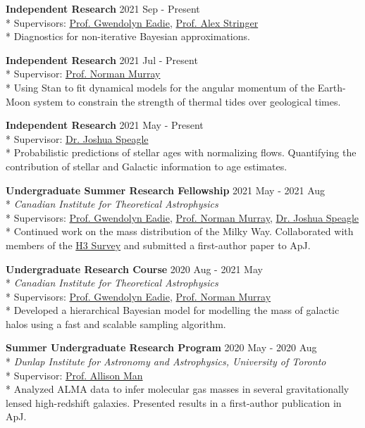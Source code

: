 \documentclass[11pt]{extarticle}
\begin{document}
\textbf{Independent Research} \hfill 2021 Sep - Present \\*
Supervisors: \href{https://www.astro.utoronto.ca/~eadie/cover.html}{Prof. Gwendolyn Eadie}, \href{https://www.alexstringer.ca/}{Prof. Alex Stringer} \\*
Diagnostics for non-iterative Bayesian approximations. 

\textbf{Independent Research} \hfill 2021 Jul - Present \\*
Supervisor: \href{https://www.cita.utoronto.ca/~murray/}{Prof. Norman Murray} \\*
Using Stan to fit dynamical models for the angular momentum of the Earth-Moon system to constrain the strength of thermal tides over geological times. 

\textbf{Independent Research} \hfill 2021 May - Present \\*
Supervisor: \href{https://joshspeagle.github.io/}{Dr. Joshua Speagle} \\*
Probabilistic predictions of stellar ages with normalizing flows. Quantifying the contribution of stellar and Galactic information to age estimates. 

\textbf{Undergraduate Summer Research Fellowship} \hfill 2021 May - 2021 Aug \\*
\textit{Canadian Institute for Theoretical Astrophysics} \\*
Supervisors: \href{https://www.astro.utoronto.ca/~eadie/cover.html}{Prof. Gwendolyn Eadie}, \href{https://www.cita.utoronto.ca/~murray/}{Prof. Norman Murray}, \href{https://joshspeagle.github.io/}{Dr. Joshua Speagle} \\*
Continued work on the mass distribution of the Milky Way. Collaborated with members of the \href{http://h3survey.rc.fas.harvard.edu/}{H3 Survey} and submitted a first-author paper to ApJ.

\textbf{Undergraduate Research Course} \hfill 2020 Aug - 2021 May\\*
\textit{Canadian Institute for Theoretical Astrophysics} \\*
Supervisors: \href{https://www.astro.utoronto.ca/~eadie/cover.html}{Prof. Gwendolyn Eadie}, \href{https://www.cita.utoronto.ca/~murray/}{Prof. Norman Murray} \\*
Developed a hierarchical Bayesian model for modelling the mass of galactic halos using a fast and scalable sampling algorithm. 

\textbf{Summer Undergraduate Research Program} \hfill 2020 May - 2020 Aug\\*
\textit{Dunlap Institute for Astronomy and Astrophysics, University of Toronto} \\*
Supervisor: \href{https://phas.ubc.ca/users/allison-man}{Prof. Allison Man} \\*
Analyzed ALMA data to infer molecular gas masses in several gravitationally lensed high-redshift galaxies. Presented results in a first-author publication in ApJ. 
\end{document}
